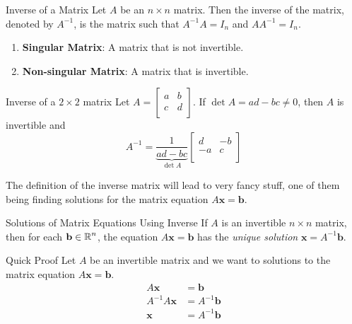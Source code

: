 \documentclass{article}
\begin{document}
\begin{definition}{Inverse of a Matrix}
	Let $A$ be an $n \times n$ matrix. Then the inverse of the matrix, denoted by $A^{-1}$, is the matrix such that $A^{-1}A = I_n$ and $AA^{-1} = I_n$.

	\begin{enumerate}[label=\alph*)]
		\item
		      \textbf{Singular Matrix}: A matrix that is not invertible.
		\item
		      \textbf{Non-singular Matrix}: A matrix that is invertible.
	\end{enumerate}
\end{definition}

\begin{theorem}{Inverse of a $2 \times 2$ matrix}
	Let $A = \begin{bmatrix}
			a & b \\
			c & d \\
		\end{bmatrix}$. If $\det A = ad - bc \neq 0$, then $A$ is invertible and
	$$
		A^{-1} = \underbrace{\frac{1}{ad - bc}}_{\det A} \begin{bmatrix}
			d  & -b \\
			-a & c  \\
		\end{bmatrix}
	$$
\end{theorem}

The definition of the inverse matrix will lead to very fancy stuff, one of them being finding solutions for the matrix equation $A\mathbf{x} = \mathbf{b}$.

\begin{theorem}{Solutions of Matrix Equations Using Inverse}
	If $A$ is an invertible $n \times n$ matrix, then for each $\mathbf{b} \in \operatorname{\mathbb{R}}^n$, the equation $A\mathbf{x} = \mathbf{b}$ has the \emph{unique solution} $\mathbf{x} = A^{-1}\mathbf{b}$.

	\begin{boxcontainer}{Quick Proof}
		Let $A$ be an invertible matrix and we want to solutions to the matrix equation $A\mathbf{x} = \mathbf{b}$.
		\begin{equation}
			\begin{split}
				A\mathbf{x}       & = \mathbf{b}       \\
				A^{-1}A\mathbf{x} & = A^{-1}\mathbf{b} \\
				\mathbf{x}        & = A^{-1}\mathbf{b}
			\end{split}
		\end{equation}
	\end{boxcontainer}
\end{theorem}
\end{document}
